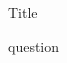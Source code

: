 \documentclass{exam}
\begin{document}
\begin{center}
    \Large Title
\end{center}

\begin{questions}
    \question
    question

\end{questions}
\end{document}
